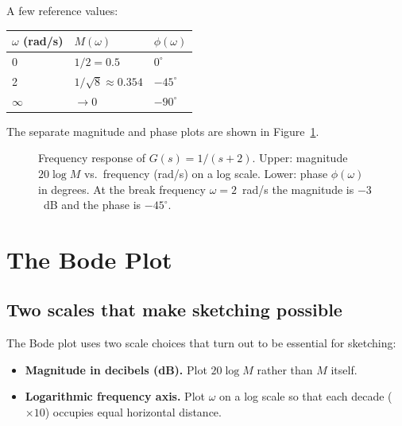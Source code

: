 \documentclass[12pt]{article}
\newcommand{\figplaceholder}[2][3in]{%
  \begin{center}
  \fbox{\parbox{#1}{\centering\vspace{0.5in}\textit{[Figure: #2]}\vspace{0.5in}}}
  \end{center}
}
\begin{document}
A few reference values:
\begin{center}
\begin{tabular}{@{}lll@{}}
\toprule
$\omega$ (rad/s) & $M(\omega)$ & $\phi(\omega)$ \\
\midrule
0   & $1/2 = 0.5$     & $0^\circ$   \\
2   & $1/\sqrt{8} \approx 0.354$ & $-45^\circ$ \\
$\infty$ & $\to 0$   & $-90^\circ$ \\
\bottomrule
\end{tabular}
\end{center}

The separate magnitude and phase plots are shown in
Figure~\ref{fig:example_bode}.

\begin{figure}[htbp]
  \figplaceholder[5in]{Separate magnitude and phase Bode plots for
    $G(s)=1/(s+2)$: magnitude rolls off from $-6$~dB at DC and phase shifts
    from $0^\circ$ toward $-90^\circ$. [Nise Fig.~10.4]}
  \caption{Frequency response of $G(s) = 1/(s+2)$.  Upper: magnitude
    $20\log M$ vs.\ frequency (rad/s) on a log scale.  Lower: phase
    $\phi(\omega)$ in degrees.  At the break frequency $\omega = 2$~rad/s
    the magnitude is $-3$~dB and the phase is $-45^\circ$.}
  \label{fig:example_bode}
\end{figure}

\section{The Bode Plot}
\label{sec:bode_plot}

\subsection{Two scales that make sketching possible}
\label{sec:scales}

The Bode plot uses two scale choices that turn out to be essential for
sketching:
\begin{itemize}
  \item \textbf{Magnitude in decibels (dB).}  Plot $20\log M$ rather than $M$
    itself.
  \item \textbf{Logarithmic frequency axis.}  Plot $\omega$ on a log scale so
    that each decade ($\times 10$) occupies equal horizontal distance.
\end{itemize}
\end{document}
